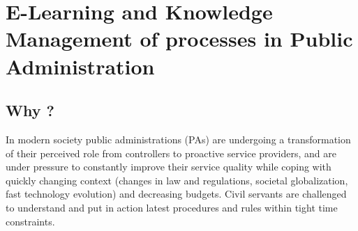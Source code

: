 \documentclass{learnpad}
\begin{document}



\mainmatter


\chapter{E-Learning and Knowledge Management of processes in Public Administration}
\label{ch:intro}

\section{Why \learnpad?}
In modern society public administrations (PAs) are undergoing a transformation
of their perceived role from controllers to proactive service providers, and are
under pressure to constantly improve their service quality while coping with
quickly changing context (changes in law and regulations, societal
globalization, fast technology evolution) and decreasing budgets.  Civil
servants are challenged to understand and put in action latest procedures and
rules within tight time constraints.
\end{document}

